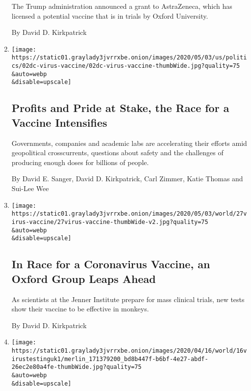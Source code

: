 \begin{enumerate}
  The Trump administration announced a grant to AstraZeneca, which has
  licensed a potential vaccine that is in trials by Oxford University.

  By David D. Kirkpatrick
\item
  \href{/2020/05/02/us/politics/vaccines-coronavirus-research.html}{}

  \texttt{[image: https://static01.graylady3jvrrxbe.onion/images/2020/05/03/us/politics/02dc-virus-vaccine/02dc-virus-vaccine-thumbWide.jpg?quality=75\\\&auto=webp\\\&disable=upscale]}

  \hypertarget{profits-and-pride-at-stake-the-race-for-a-vaccine-intensifies}{%
  \subsection{Profits and Pride at Stake, the Race for a Vaccine
  Intensifies}\label{profits-and-pride-at-stake-the-race-for-a-vaccine-intensifies}}

  Governments, companies and academic labs are accelerating their
  efforts amid geopolitical crosscurrents, questions about safety and
  the challenges of producing enough doses for billions of people.

  By David E. Sanger, David D. Kirkpatrick, Carl Zimmer, Katie Thomas
  and Sui-Lee Wee
\item
  \href{/2020/04/27/world/europe/coronavirus-vaccine-update-oxford.html}{}

  \texttt{[image: https://static01.graylady3jvrrxbe.onion/images/2020/05/03/world/27virus-vaccine/27virus-vaccine-thumbWide-v2.jpg?quality=75\\\&auto=webp\\\&disable=upscale]}

  \hypertarget{in-race-for-a-coronavirus-vaccine-an-oxford-group-leaps-ahead}{%
  \subsection{In Race for a Coronavirus Vaccine, an Oxford Group Leaps
  Ahead}\label{in-race-for-a-coronavirus-vaccine-an-oxford-group-leaps-ahead}}

  As scientists at the Jenner Institute prepare for mass clinical
  trials, new tests show their vaccine to be effective in monkeys.

  By David D. Kirkpatrick
\item
  \href{/2020/04/16/world/europe/coronavirus-antibody-test-uk.html}{}

  \texttt{[image: https://static01.graylady3jvrrxbe.onion/images/2020/04/16/world/16virustestinguk1/merlin\_171379200\_bd8b447f-b6bf-4e27-abdf-26ec2e80a4fe-thumbWide.jpg?quality=75\\\&auto=webp\\\&disable=upscale]}


\end{enumerate}
